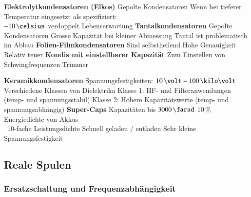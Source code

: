 \begin{minipage}[t]{0.48\columnwidth}
    \begin{outline}
        \1 \textbf{Elektrolytkondensatoren (Elkos)}
            \2 Gepolte Kondensatoren
            \2 Wenn bei tieferer Temperatur eingesetzt als spezifiziert: \\
                $-10 \, \celsius$ verdoppelt Lebenserwartung
        \1 \textbf{Tantalkondensatoren}
            \2 Gepolte Kondensatoren
            \2 Grosse Kapazität bei kleiner Abmessung
            \2 Tantal ist problematisch im Abbau
        \1 \textbf{Folien-Filmkondensatoren}
            \2 Sind selbstheilend 
            \2 Hohe Genauigkeit
            \2 Relativ teuer
        \1 \textbf{Kondis mit einstellbarer Kapazität}
            \2 Zum Einstellen von Schwingfrequenzen
            \2 Trimmer
    \end{outline}
\end{minipage}
\hfill
\begin{minipage}[t]{0.48\columnwidth}
    \begin{outline}
        \1 \textbf{Keramikkondensatoren}
            \2 Spannungsfestigkeiten: $10 \, \volt - 100 \, \kilo \volt$
            \2 Verschiedene Klassen von Dielektrika
                \3 Klasse 1: HF- und Filteranwendungen (temp- und spannungsstabil)
                \3 Klasse 2: Höhere Kapazitätswerte (temp- und spannungsabhängig)
        \1 \textbf{Super-Caps}
            \2 Kapazitäten bis $3000 \, \farad$
            \2 $10 \, \%$ Energiedichte von Akkus \\
                \textrightarrow\ 10-fache Leistungsdichte 
            \2 Schnell geladen / entladen
            \2 Sehr kleine Spannungsfestigkeit
    \end{outline}
\end{minipage}


\subsection{Reale Spulen}


\subsubsection{Ersatzschaltung und Frequenzabhängigkeit}

